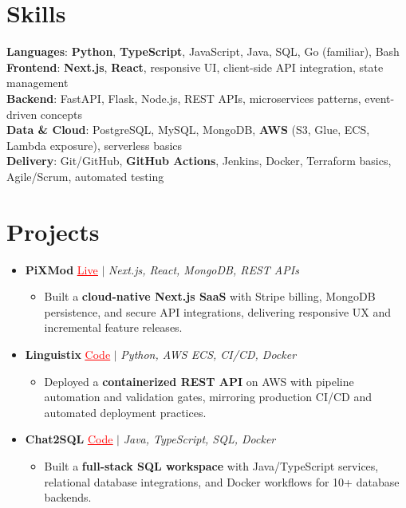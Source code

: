 \documentclass[letterpaper,10pt]{article}
\newcommand{\resumeItem}[1]{\item\small{{#1 \vspace{-2pt}}}}
\newcommand{\resumeProjectHeading}[1]{\item \small #1 \vspace{-2pt}}
\newcommand{\resumeSubHeadingListStart}{\begin{itemize}[leftmargin=0.0in, label={}]}
\newcommand{\resumeSubHeadingListEnd}{\end{itemize}}
\newcommand{\resumeProjItemListStart}{\begin{itemize}[leftmargin=0.15in,label=\textbullet,itemsep=0pt,topsep=0pt,parsep=0pt,partopsep=0pt]}
\newcommand{\resumeProjItemListEnd}{\end{itemize}\vspace{-4pt}}
\begin{document}
\section{Skills}
\begin{itemize}[leftmargin=0.15in, label={}]
\small{\item{
\textbf{Languages}: \textbf{Python}, \textbf{TypeScript}, JavaScript, Java, SQL, Go (familiar), Bash \\
\textbf{Frontend}: \textbf{Next.js}, \textbf{React}, responsive UI, client-side API integration, state management \\
\textbf{Backend}: FastAPI, Flask, Node.js, REST APIs, microservices patterns, event-driven concepts \\
\textbf{Data \& Cloud}: PostgreSQL, MySQL, MongoDB, \textbf{AWS} (S3, Glue, ECS, Lambda exposure), serverless basics \\
\textbf{Delivery}: Git/GitHub, \textbf{GitHub Actions}, Jenkins, Docker, Terraform basics, Agile/Scrum, automated testing
}}
\end{itemize}
\vspace{-16pt}
\section{Projects}
\resumeSubHeadingListStart
\vspace{-2pt}
\resumeProjectHeading{\textbf{PiXMod} {\href{https://pixmod.vercel.app/}{\textcolor{red}{\underline{Live}}}} $|$ \emph{Next.js, React, MongoDB, REST APIs}}
\resumeProjItemListStart
\resumeItem{Built a \textbf{cloud-native Next.js SaaS} with Stripe billing, MongoDB persistence, and secure API integrations, delivering responsive UX and incremental feature releases.}
\resumeProjItemListEnd
\vspace{3pt}
\resumeProjectHeading{\textbf{Linguistix} {\href{https://github.com/SAHAJ-BHADJA/Linguistix}{\textcolor{red}{\underline{Code}}}} $|$ \emph{Python, AWS ECS, CI/CD, Docker}}
\resumeProjItemListStart
\resumeItem{Deployed a \textbf{containerized REST API} on AWS with pipeline automation and validation gates, mirroring production CI/CD and automated deployment practices.}
\resumeProjItemListEnd
\vspace{3pt}
\resumeProjectHeading{\textbf{Chat2SQL} {\href{https://github.com/SAHAJ-BHADJA/Chat2SQL}{\textcolor{red}{\underline{Code}}}} $|$ \emph{Java, TypeScript, SQL, Docker}}
\resumeProjItemListStart
\resumeItem{Built a \textbf{full-stack SQL workspace} with Java/TypeScript services, relational database integrations, and Docker workflows for 10+ database backends.}
\resumeProjItemListEnd
\resumeSubHeadingListEnd
\end{document}
